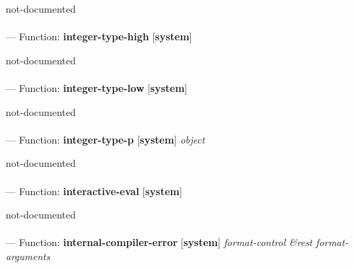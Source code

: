 \begin{adjustwidth}{5em}{5em}
not-documented
\end{adjustwidth}

\paragraph{}
\label{SYSTEM:INTEGER-TYPE-HIGH}
--- Function: \textbf{integer-type-high} [\textbf{system}] \textit{}

\begin{adjustwidth}{5em}{5em}
not-documented
\end{adjustwidth}

\paragraph{}
\label{SYSTEM:INTEGER-TYPE-LOW}
--- Function: \textbf{integer-type-low} [\textbf{system}] \textit{}

\begin{adjustwidth}{5em}{5em}
not-documented
\end{adjustwidth}

\paragraph{}
\label{SYSTEM:INTEGER-TYPE-P}
--- Function: \textbf{integer-type-p} [\textbf{system}] \textit{object}

\begin{adjustwidth}{5em}{5em}
not-documented
\end{adjustwidth}

\paragraph{}
\label{SYSTEM:INTERACTIVE-EVAL}
--- Function: \textbf{interactive-eval} [\textbf{system}] \textit{}

\begin{adjustwidth}{5em}{5em}
not-documented
\end{adjustwidth}

\paragraph{}
\label{SYSTEM:INTERNAL-COMPILER-ERROR}
--- Function: \textbf{internal-compiler-error} [\textbf{system}] \textit{format-control \&rest format-arguments}

